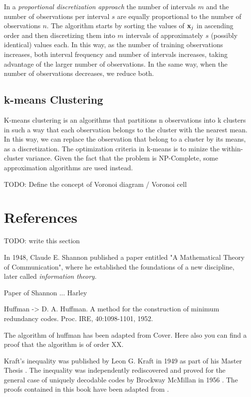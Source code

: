 In a \emph{proportional discretization approach} the number of intervals $m$ and the number of observations per interval $s$ are equally proportional to the number of observations $n$. The algorithm starts by sorting the values of $\bold{x}_j$ in ascending order and then discretizing them into $m$ intervals of approximately $s$ (possibly identical) values each. In this way, as the number of training observations increases, both interval frequency and number of intervals increases, taking advantage of the larger number of observations. In the same way, when the number of observations decreases, we reduce both.

\subsection{k-means Clustering}
\label{sec:kmeans_clustering}

K-means clustering is an algorithms that partitions n observations into k clusters in such a way that each observation belongs to the cluster with the nearest mean. In this way, we can replace the observation that belong to a cluster by its means, as a discretization. The optimization criteria in k-means is to minize the within-cluster variance. Given the fact that the problem is NP-Complete, some approximation algorithms are used instead.

{\color{red} TODO: Define the concept of Voronoi diagram / Voronoi cell}

\section*{References}

{\color{red} TODO: write this section}

In 1948, Claude E. Shannon published a paper entitled "A Mathematical Theory of Communication", where he established the foundations of a new discipline, later called \emph{information theory}.

Paper of Shannon ... Harley

Huffman -> D. A. Huffman. A method for the construction of minimum redundancy codes. Proc. IRE, 40:1098-1101, 1952.

The algorithm of huffman has been adapted from Cover. Here also you can find a proof that the algorithm is of order XX. 

Kraft's inequality was published by Leon G. Kraft in 1949 as part of his Master Thesis \cite{kraft1949device}. The inequality was independently rediscovered and proved for the general case of uniquely decodable codes by Brockway McMillan in 1956 \cite{mcmillan1956two}. The proofs contained in this book have been adapted from \cite{cover2012elements}.


